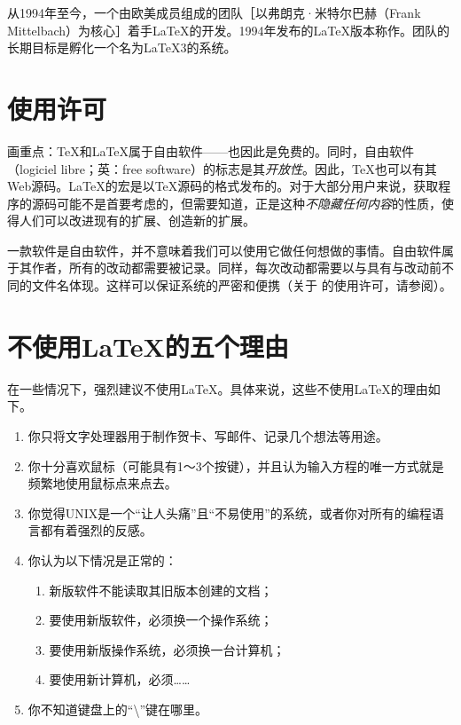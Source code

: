 从1994年至今，一个由欧美成员组成的团队［以弗朗克·米特尔巴赫（Frank Mittelbach）为核心］着手\LaTeX 的开发。1994年发布的\LaTeX 版本称作\LaTeXe。团队的长期目标是孵化一个名为\LaTeX 3的系统。

\section*{使用许可}

画重点：\TeX 和\LaTeX 属于自由软件——也因此是免费的。同时，自由软件（logiciel libre；英：free software）的标志是其\emph{开放性}。因此，\TeX 也可以有其Web源码。\LaTeX 的宏是以\TeX 源码的格式发布的。对于大部分用户来说，获取程序的源码可能不是首要考虑的，但需要知道，正是这种\emph{不隐藏任何内容}的性质，使得人们可以改进现有的扩展、创造新的扩展。

一款软件是自由软件，并不意味着我们可以使用它做任何想做的事情。自由软件属于其\linebreak 作者，所有的改动都需要被记录。同样，每次改动都需要以与具有与改动前不同的\linebreak 文件名体现。这样可以保证系统的严密和便携（关于 \LaTeXe  的使用许可，请参阅\linebreak {}）。

\section*{不使用\LaTeX 的五个理由}

在一些情况下，强烈建议不使用\LaTeX 。具体来说，这些不使用\LaTeX 的理由如下。

\begin{enumerate}
    \item 你只将文字处理器用于制作贺卡、写邮件、记录几个想法等用途。
    \item 你十分喜欢鼠标（可能具有1～3个按键），并且认为输入方程的唯一方式就是频繁地使用鼠标点来点去。
    \item 你觉得UNIX是一个“让人头痛”且“不易使用”的系统，或者你对所有的编程语言都有着强烈的反感。
    \item 你认为以下情况是正常的：
        \begin{enumerate}
            \item 新版软件不能读取其旧版本创建的文档；
            \item 要使用新版软件，必须换一个操作系统；
            \item 要使用新版操作系统，必须换一台计算机；
            \item 要使用新计算机，必须……
        \end{enumerate}
    \item 你不知道键盘上的“\backslash”键在哪里。
\end{enumerate}

